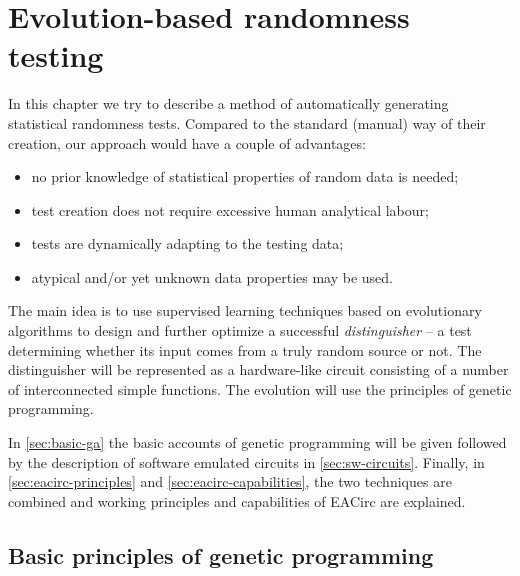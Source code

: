\documentclass[12pt,twoside]{fithesis2}		%
\renewcommand{\_}{\leavevmode \kern0.0em\vbox{\hrule width0.4em}}
\newcommand{\squarebullet}{\textcolor{black}{\raisebox{0.15em}{\rule{4pt}{4pt}}}}
\newenvironment{myItemize}{
  \begin{itemize}[leftmargin=2em,rightmargin=1em,itemsep=\parskip ,parsep=0em,topsep=0em,partopsep=0em]
  \renewcommand{\labelitemi}{\squarebullet}
  \renewcommand{\labelitemii}{$\diamond$}
}{
  \end{itemize}
}
\begin{document}
\chapter{Evolution-based randomness testing}
\label{chap:evo-based-testing}

In this chapter we try to describe a method of automatically generating statistical randomness tests. Compared to the standard
(manual) way of their creation, our approach would have a couple of advantages: 
\begin{myItemize}
\item no prior knowledge of statistical properties of random data is needed;
\item test creation does not require excessive human analytical labour;
\item tests are dynamically adapting to the testing data;
\item atypical and/or yet unknown data properties may be used.
\end{myItemize}

\noindent
The main idea is to use supervised learning techniques based on evolutionary algorithms to design and further 
optimize a successful \textit{distinguisher} -- a test determining whether its input comes from a truly random source or not. 
The distinguisher will be represented as a hardware-like circuit consisting of a number of interconnected simple functions.
The evolution will use the principles of genetic programming.

In \autoref{sec:basic-ga} the basic accounts of genetic programming will be given followed by the description
of software emulated circuits in \autoref{sec:sw-circuits}. Finally, in \autoref{sec:eacirc-principles} and 
\autoref{sec:eacirc-capabilities}, the two techniques are combined and working principles and capabilities of EACirc are
explained.

\section{Basic principles of genetic programming}
\label{sec:basic-ga}
\end{document}
